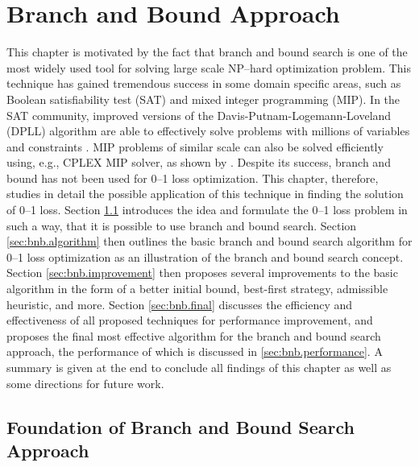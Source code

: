 \section{Branch and Bound Approach}
\label{cha:branchandbound}

This chapter is motivated by the fact that branch and bound  search is one of the most widely used tool for solving large scale NP--hard optimization problem. This technique has gained tremendous success in some domain specific areas, such as Boolean satisfiability test (SAT) and mixed integer programming (MIP). In the SAT community, improved versions of the Davis-Putnam-Logemann-Loveland (DPLL) algorithm are able to effectively solve problems with millions of variables and constraints \cite{harmelen}. MIP problems of similar scale can also be solved efficiently using, e.g., CPLEX MIP solver, as shown by \cite{ntaimo}. Despite its success, branch and bound has not been used for 0--1 loss optimization. This chapter, therefore, studies in detail the possible application of this technique in finding the solution of 0--1 loss. Section \ref{sec:bnb.idea} introduces the idea and formulate the 0--1 loss problem in such a way, that it is possible to use branch and bound search. Section \ref{sec:bnb.algorithm} then outlines the basic branch and bound search algorithm for 0--1 loss optimization as an illustration of the branch and bound search concept. Section \ref{sec:bnb.improvement} then proposes several improvements to the basic algorithm in the form of a better initial bound, best-first strategy,  admissible heuristic, and more. Section \ref{sec:bnb.final} discusses the efficiency and effectiveness of all proposed techniques for performance improvement, and proposes the final most effective algorithm for the branch and bound search approach, the performance of which is discussed in \ref{sec:bnb.performance}. A summary is given at the end to conclude all findings of this chapter as well as some directions for future work.



\subsection{Foundation of Branch and Bound Search Approach}
\label{sec:bnb.idea}

